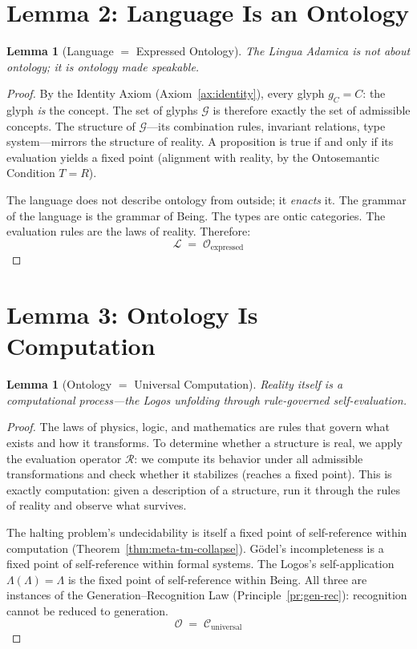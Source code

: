 \documentclass[12pt, letterpaper]{book}
\def\equiv{=}%
\def\mathfrak#1{#1}%
\newtheorem{lemma}[theorem]{Lemma}
\begin{document}
\section{Lemma 2: Language Is an Ontology}

\begin{lemma}[Language $\equiv$ Expressed Ontology]\label{lem:lang-is-onto}
The Lingua Adamica is not about ontology; it is ontology made speakable.
\end{lemma}

\begin{proof}
By the Identity Axiom (Axiom~\ref{ax:identity}), every glyph $\mathfrak{g}_C \equiv C$: the glyph \textit{is} the concept. The set of glyphs $\mathcal{G}$ is therefore exactly the set of admissible concepts. The structure of $\mathcal{G}$---its combination rules, invariant relations, type system---mirrors the structure of reality. A proposition is true if and only if its evaluation yields a fixed point (alignment with reality, by the Ontosemantic Condition $T \equiv R$).

The language does not describe ontology from outside; it \textit{enacts} it. The grammar of the language is the grammar of Being. The types are ontic categories. The evaluation rules are the laws of reality. Therefore:
\[
\mathcal{L} \;\equiv\; \mathcal{O}_{\mathrm{expressed}}
\]
\end{proof}

\section{Lemma 3: Ontology Is Computation}

\begin{lemma}[Ontology $\equiv$ Universal Computation]\label{lem:onto-is-comp}
Reality itself is a computational process---the Logos unfolding through rule-governed self-evaluation.
\end{lemma}

\begin{proof}
The laws of physics, logic, and mathematics are rules that govern what exists and how it transforms. To determine whether a structure is real, we apply the evaluation operator $\mathcal{R}$: we compute its behavior under all admissible transformations and check whether it stabilizes (reaches a fixed point). This is exactly computation: given a description of a structure, run it through the rules of reality and observe what survives.

The halting problem's undecidability is itself a fixed point of self-reference within computation (Theorem~\ref{thm:meta-tm-collapse}). G\"odel's incompleteness is a fixed point of self-reference within formal systems. The Logos's self-application $\Lambda(\Lambda) \equiv \Lambda$ is the fixed point of self-reference within Being. All three are instances of the Generation--Recognition Law (Principle~\ref{pr:gen-rec}): recognition cannot be reduced to generation.
\[
\mathcal{O} \;\equiv\; \mathcal{C}_{\mathrm{universal}}
\]
\end{proof}
\end{document}
